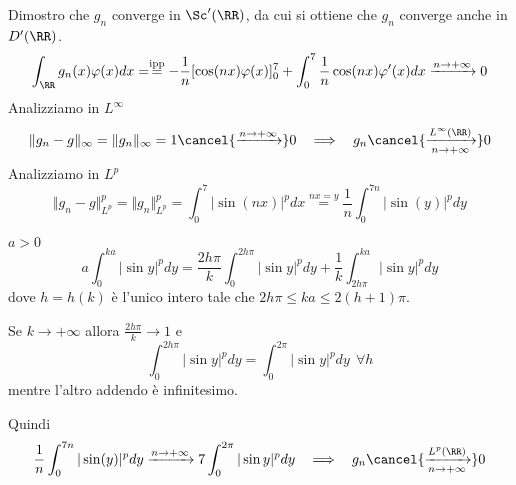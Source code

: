 Dimostro che $g_{n}$ converge in $\Sc'(\RR)$, da cui si ottiene che $g_{n}$ converge anche in $D'(\RR)$.
\begin{equation*}
\int_{\RR} g_{n}(x) \varphi (x) dx = \overset{\text{ipp}}{=} - \frac{1}{n}[\cos(nx) \varphi (x)]^{7}_{0} + \int^{7}_{0}\frac{1}{n}\cos(nx) \varphi'(x) dx\xrightarrow{n\rightarrow + \infty} 0
\end{equation*}
Analizziamo in $L^{\infty}$
\begin{equation*}
\Vert g_{n} - g\Vert_{\infty} = \Vert g_{n}\Vert_{\infty} = 1\cancel{\xrightarrow{n\rightarrow + \infty}} 0\ \ \implies \ \ g_{n}\cancel{\xrightarrow[n\rightarrow + \infty ]{L^{\infty}(\RR)}} 0
\end{equation*}
Analizziamo in $L^{p}$
\begin{equation*}
\Vert g_{n} - g\Vert^{p}_{L^{p}} = \Vert g_{n}\Vert^{p}_{L^{p}} = \int^{7}_{0}| \sin(nx)|^{p} dx\overset{nx = y}{=}\frac{1}{n}\int^{7n}_{0}| \sin(y)|^{p} dy
\end{equation*}
\begin{rem}
$a > 0$
\begin{equation*}
a\int^{ka}_{0}| \sin y|^{p} dy = \frac{2h\pi}{k}\int^{2h\pi}_{0}| \sin y|^{p} dy + \frac{1}{k}\int^{ka}_{2h\pi}| \sin y|^{p} dy
\end{equation*}
dove $h = h(k)$ è l'unico intero tale che $2h\pi \leq ka \leq 2(h + 1) \pi $.

Se $k\rightarrow + \infty $ allora $\frac{2h\pi}{k}\rightarrow 1$ e
\begin{equation*}
\int^{2h\pi}_{0}| \sin y|^{p} dy = \int^{2\pi}_{0}| \sin y|^{p} dy\ \ \forall h
\end{equation*}
mentre l'altro addendo è infinitesimo.
\end{rem}
Quindi
\begin{equation*}
\frac{1}{n}\int^{7n}_{0}| \sin(y)|^{p} dy\xrightarrow{n\rightarrow + \infty} 7\int^{2\pi}_{0}| \sin y|^{p} dy\ \ \implies \ \ g_{n}\cancel{\xrightarrow[n\rightarrow + \infty ]{L^{p}(\RR)}} 0
\end{equation*}

\Soluzione

